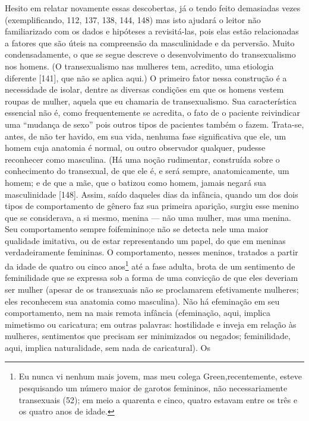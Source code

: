 Hesito em relatar novamente essas descobertas, já o tendo feito
demasiadas vezes (exemplificando, 112, 137, 138, 144, 148) mas isto
ajudará o leitor não familiarizado com os dados e hipóteses a
revisitá-las, pois elas estão relacionadas a fatores que são úteis na
compreensão da masculinidade e da perversão. Muito condensadamente, o
que se segue descreve o desenvolvimento do transexualismo nos homens.
(O transexualismo nas mulheres tem, acredito, uma etiologia diferente
[141], que não se aplica aqui.) O primeiro fator nessa construção é a
necessidade de isolar, dentre as diversas condições em que os homens
vestem roupas de mulher, aquela que eu chamaria de transexualismo. Sua
característica essencial não é, como frequentemente se acredita, o fato
de o paciente reivindicar uma ``mudança de
sexo'' pois outros tipos de pacientes também o fazem.
Trata-se, antes, de não ter havido, em sua vida, nenhuma fase
significativa que ele, um homem cuja anatomia é normal, ou outro
observador qualquer, pudesse reconhecer como masculina. (Há uma noção
rudimentar, construída sobre o conhecimento do transexual, de que ele
é, e será sempre, anatomicamente, um homem; e de que a mãe, que o
batizou como homem, jamais negará sua masculinidade [148]. Assim, saído
daqueles dias da infância, quando um dos dois tipos de comportamento de
gênero faz sua primeira aparição, surgiu esse menino que se
considerava, a si mesmo, menina --- não uma mulher, mas uma menina. Seu
comportamento sempre foi\idxhomosafem[|(] feminino;\idxidenefe[|(] e não se detecta nele uma maior
qualidade imitativa, ou de estar representando um papel, do que em
meninas verdadeiramente femininas. O comportamento, nesses meninos,
tratados a partir da idade de quatro ou cinco anos\footnote{ Eu nunca
vi nenhum mais jovem, mas meu colega Green,\idxgreen[|nn] recentemente, esteve
pesquisando um número maior de garotos femininos, não necessariamente
transexuais (52); em meio a quarenta e cinco, quatro estavam entre os
três e os quatro anos de idade.} até a fase adulta, brota de um
sentimento de feminilidade que se expressa sob a forma de uma convicção
de que eles deveriam ser mulher (apesar de os transexuais não se
proclamarem efetivamente mulheres; eles reconhecem sua anatomia como
masculina). Não há efeminação em seu comportamento, nem na mais
remota infância (efeminação, aqui, implica mimetismo ou caricatura; em
outras palavras: hostilidade e inveja em relação às mulheres,
sentimentos que precisam ser minimizados ou negados; feminilidade,
aqui, implica naturalidade, sem nada de caricatural). Os            %
